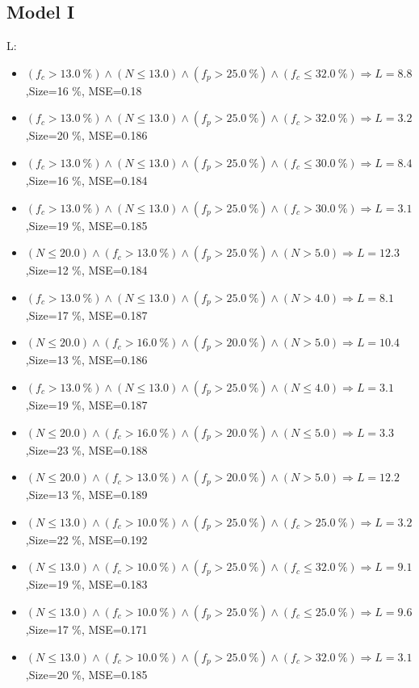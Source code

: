 \documentclass[numbered]{CSL}
\begin{document}
\subsection{Model I}
L:
\begin{itemize}
\item $(f_c > 13.0~\%) \land (N \leq 13.0) \land (f_p > 25.0~\%) \land (f_c \leq 32.0~\%) \Rightarrow L = 8.8$,\hfill Size=16 \%, MSE=0.18
\item $(f_c > 13.0~\%) \land (N \leq 13.0) \land (f_p > 25.0~\%) \land (f_c > 32.0~\%) \Rightarrow L = 3.2$,\hfill Size=20 \%, MSE=0.186
\item $(f_c > 13.0~\%) \land (N \leq 13.0) \land (f_p > 25.0~\%) \land (f_c \leq 30.0~\%) \Rightarrow L = 8.4$,\hfill Size=16 \%, MSE=0.184
\item $(f_c > 13.0~\%) \land (N \leq 13.0) \land (f_p > 25.0~\%) \land (f_c > 30.0~\%) \Rightarrow L = 3.1$,\hfill Size=19 \%, MSE=0.185
\item $(N \leq 20.0) \land (f_c > 13.0~\%) \land (f_p > 25.0~\%) \land (N > 5.0) \Rightarrow L = 12.3$,\hfill Size=12 \%, MSE=0.184
\item $(f_c > 13.0~\%) \land (N \leq 13.0) \land (f_p > 25.0~\%) \land (N > 4.0) \Rightarrow L = 8.1$,\hfill Size=17 \%, MSE=0.187
\item $(N \leq 20.0) \land (f_c > 16.0~\%) \land (f_p > 20.0~\%) \land (N > 5.0) \Rightarrow L = 10.4$,\hfill Size=13 \%, MSE=0.186
\item $(f_c > 13.0~\%) \land (N \leq 13.0) \land (f_p > 25.0~\%) \land (N \leq 4.0) \Rightarrow L = 3.1$,\hfill Size=19 \%, MSE=0.187
\item $(N \leq 20.0) \land (f_c > 16.0~\%) \land (f_p > 20.0~\%) \land (N \leq 5.0) \Rightarrow L = 3.3$,\hfill Size=23 \%, MSE=0.188
\item $(N \leq 20.0) \land (f_c > 13.0~\%) \land (f_p > 20.0~\%) \land (N > 5.0) \Rightarrow L = 12.2$,\hfill Size=13 \%, MSE=0.189
\item $(N \leq 13.0) \land (f_c > 10.0~\%) \land (f_p > 25.0~\%) \land (f_c > 25.0~\%) \Rightarrow L = 3.2$,\hfill Size=22 \%, MSE=0.192
\item $(N \leq 13.0) \land (f_c > 10.0~\%) \land (f_p > 25.0~\%) \land (f_c \leq 32.0~\%) \Rightarrow L = 9.1$,\hfill Size=19 \%, MSE=0.183
\item $(N \leq 13.0) \land (f_c > 10.0~\%) \land (f_p > 25.0~\%) \land (f_c \leq 25.0~\%) \Rightarrow L = 9.6$,\hfill Size=17 \%, MSE=0.171
\item $(N \leq 13.0) \land (f_c > 10.0~\%) \land (f_p > 25.0~\%) \land (f_c > 32.0~\%) \Rightarrow L = 3.1$,\hfill Size=20 \%, MSE=0.185

\end{itemize}
\end{document}
